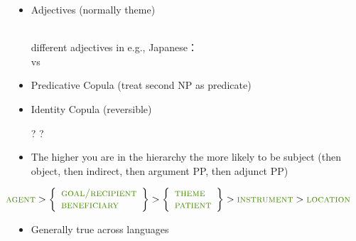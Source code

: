 \documentclass[headrule,footrule]{foils}
\begin{document}

\begin{itemize}
\item Adjectives  (normally theme)
  \begin{exe}
  \ex {} 
  \ex {} 
  \ex {} 
    \\ different adjectives in e.g., Japanese：
    \\     vs  
  \end{exe}
\item Predicative Copula (treat second NP as predicate)
  \begin{exe}
  \ex {} 
  \end{exe}
\item Identity Copula (reversible)
  \begin{exe}
  \ex {} ?
  \ex {} ?
  \end{exe}


\end{itemize}




\begin{itemize}
\item  The higher you are in the hierarchy the more likely 
to be subject (then object, then indirect, then 
argument PP, then adjunct PP)
\end{itemize}

\[  \hspace*{-3em}\mbox{\tr{agent}} > 
\left\{\begin{array}[c]{l} \mbox{\tr{goal/recipient}} \\ \mbox{\tr{beneficiary}} \end{array} \right\}  >
\left\{\begin{array}[c]{l} \mbox{\tr{theme}} \\ \mbox{\tr{patient}} \end{array} \right\}  >
\mbox{\tr{instrument}} > 
\mbox{\tr{location}} \]

\begin{itemize}
\item  Generally true across languages
\end{itemize}
\end{document}
